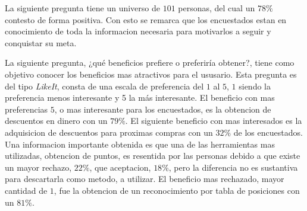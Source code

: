 La siguiente pregunta tiene un universo de $101$ personas, del cual un $78\%$ contesto de forma positiva.
Con esto se remarca que los encuestados estan en conocimiento de toda la informacion necesaria 
para motivarlos a seguir y conquistar su meta.




La siguiente pregunta, ¿qué beneficios prefiere o preferiría obtener?, tiene como objetivo conocer los
 beneficios mas atractivos para el ususario. Esta pregunta es del tipo \emph{LikeIt}, consta de una 
escala de preferencia del $1$ al $5$, $1$ siendo la preferencia menos interesante y 5 la más interesante.
 El beneficio con mas preferencias $5$, o mas interesante para los encuestados, es la obtencion de
descuentos en dinero con un $79\%$. El siguiente beneficio con mas interesados es la adquisicion 
de descuentos para proximas compras con un $32\%$ de los encuestados. Una informacion importante 
obtenida es que una de las herramientas mas utilizadas, obtencion de puntos, es resentida por las
personas debido a que existe un mayor rechazo, $22\%$, que aceptacion, $18\%$, pero la diferencia 
no es sustantiva para descartarla como metodo, {} a utilizar.
 El beneficio mas rechazado, mayor cantidad de $1$, fue la obtencion de un reconocimiento por tabla
 de posiciones con un $81\%$.



